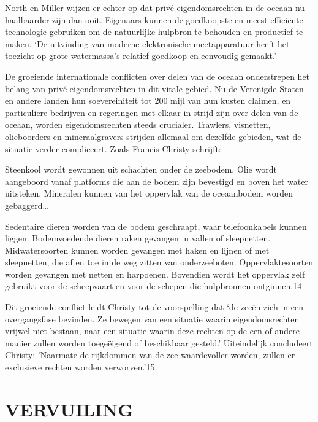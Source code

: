 \documentclass[
  a5paper,
  smalldemyvopaper,10pt,twoside,onecolumn,openright,extrafontsizes,hidelinks]{memoir}
\renewenvironment{quote}%
               {\list{}{\rightmargin=.6cm\leftmargin=.6cm}%
                \itshape \item[]}%
               {\endlist}
\begin{document}
North en Miller wijzen er echter op dat privé-eigendomsrechten in de
oceaan nu haalbaarder zijn dan ooit. Eigenaars kunnen de goedkoopste en
meest efficiënte technologie gebruiken om de natuurlijke hulpbron te
behouden en productief te maken. `De uitvinding van moderne
elektronische meetapparatuur heeft het toezicht op grote watermassa's
relatief goedkoop en eenvoudig gemaakt.'

De groeiende internationale conflicten over delen van de oceaan
onderstrepen het belang van privé-eigendomsrechten in dit vitale gebied.
Nu de Verenigde Staten en andere landen hun soevereiniteit tot 200 mijl
van hun kusten claimen, en particuliere bedrijven en regeringen met
elkaar in strijd zijn over delen van de oceaan, worden eigendomsrechten
steeds crucialer. Trawlers, visnetten, olieboorders en mineraalgravers
strijden allemaal om dezelfde gebieden, wat de situatie verder
compliceert. Zoals Francis Christy schrijft:

\begin{quote}
Steenkool wordt gewonnen uit schachten onder de zeebodem. Olie wordt
aangeboord vanaf platforms die aan de bodem zijn bevestigd en boven het
water uitsteken. Mineralen kunnen van het oppervlak van de oceaanbodem
worden gebaggerd\ldots{}

Sedentaire dieren worden van de bodem geschraapt, waar telefoonkabels
kunnen liggen. Bodemvoedende dieren raken gevangen in vallen of
sleepnetten. Midwatersoorten kunnen worden gevangen met haken en lijnen
of met sleepnetten, die af en toe in de weg zitten van onderzeeboten.
Oppervlaktesoorten worden gevangen met netten en harpoenen. Bovendien
wordt het oppervlak zelf gebruikt voor de scheepvaart en voor de schepen
die hulpbronnen ontginnen.14
\end{quote}

Dit groeiende conflict leidt Christy tot de voorspelling dat `de zeeën
zich in een overgangsfase bevinden. Ze bewegen van een situatie waarin
eigendomsrechten vrijwel niet bestaan, naar een situatie waarin deze
rechten op de een of andere manier zullen worden toegeëigend of
beschikbaar gesteld.' Uiteindelijk concludeert Christy: 'Naarmate de
rijkdommen van de zee waardevoller worden, zullen er exclusieve rechten
worden verworven.'15

\section{VERVUILING}\label{vervuiling}
\end{document}
